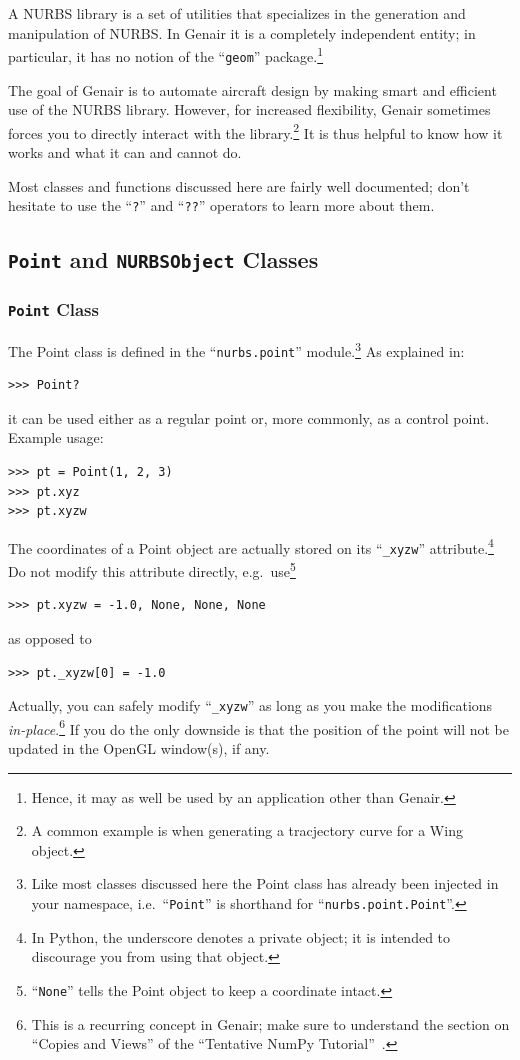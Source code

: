 \documentclass[]{article}
\begin{document}
A NURBS library is a set of utilities that specializes in the generation 
and manipulation of NURBS.  In Genair it is a completely independent 
entity; in particular, it has no notion of the ``\texttt{geom}'' 
package.\footnote{Hence, it may as well be used by an application other 
than Genair.}

The goal of Genair is to automate aircraft design by making smart and 
efficient use of the NURBS library.  However, for increased flexibility, 
Genair sometimes forces you to directly interact with the 
library.\footnote{A common example is when generating a tracjectory 
curve for a Wing object.}  It is thus helpful to know how it works and 
what it can and cannot do.

Most classes and functions discussed here are fairly well documented; 
don't hesitate to use the ``\texttt{?}'' and ``\texttt{??}'' operators 
to learn more about them.

\subsection{\texttt{Point} and \texttt{NURBSObject} Classes}
\label{subsec:nurbs}

\subsubsection{\texttt{Point} Class}

The Point class is defined in the ``\texttt{nurbs.point}'' 
module.\footnote{Like most classes discussed here the Point class has 
already been injected in your namespace, i.e.\ ``\texttt{Point}'' is 
shorthand for ``\texttt{nurbs.point.Point}''.}  As explained in:
\begin{verbatim}
>>> Point?
\end{verbatim}
it can be used either as a regular point or, more commonly, as a control 
point.  Example usage:
\begin{verbatim}
>>> pt = Point(1, 2, 3)
>>> pt.xyz
>>> pt.xyzw
\end{verbatim}

The coordinates of a Point object are actually stored on its 
``\texttt{\_xyzw}'' attribute.\footnote{In Python, the underscore 
denotes a private object; it is intended to discourage you from using 
that object.}  Do not modify this attribute directly, e.g.\ 
use\footnote{``\texttt{None}'' tells the Point object to keep a 
coordinate intact.}
\begin{verbatim}
>>> pt.xyzw = -1.0, None, None, None
\end{verbatim}
as opposed to
\begin{verbatim}
>>> pt._xyzw[0] = -1.0
\end{verbatim}
Actually, you can safely modify ``\texttt{\_xyzw}'' as long as you make 
the modifications \emph{in-place}.\footnote{This is a recurring concept 
in Genair; make sure to understand the section on ``Copies and Views'' 
of the ``Tentative NumPy Tutorial''~\cite{numpy}.}  If you do the only 
downside is that the position of the point will not be updated in the 
OpenGL window(s), if any.
\end{document}
